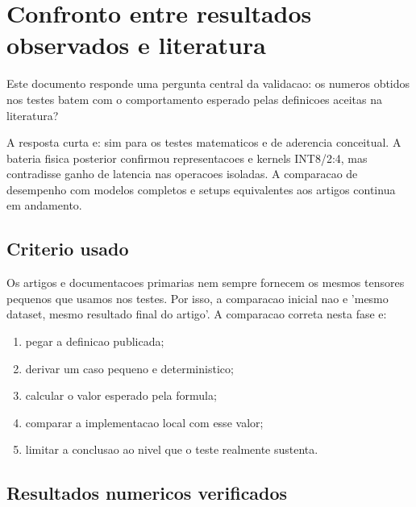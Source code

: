 

\chapter{Confronto entre resultados observados e literatura}





Este documento responde uma pergunta central da validacao: os numeros obtidos nos testes batem com o comportamento esperado pelas definicoes aceitas na literatura?





A resposta curta e: sim para os testes matematicos e de aderencia conceitual.
A bateria fisica posterior confirmou representacoes e kernels INT8/2:4, mas
contradisse ganho de latencia nas operacoes isoladas. A comparacao de desempenho
com modelos completos e setups equivalentes aos artigos continua em andamento.



\section{Criterio usado}





Os artigos e documentacoes primarias nem sempre fornecem os mesmos tensores pequenos que usamos nos testes. Por isso, a comparacao inicial nao e 'mesmo dataset, mesmo resultado final do artigo'. A comparacao correta nesta fase e:


\begin{enumerate}
\item pegar a definicao publicada;
\item derivar um caso pequeno e deterministico;
\item calcular o valor esperado pela formula;
\item comparar a implementacao local com esse valor;
\item limitar a conclusao ao nivel que o teste realmente sustenta.
\end{enumerate}


\section{Resultados numericos verificados}



